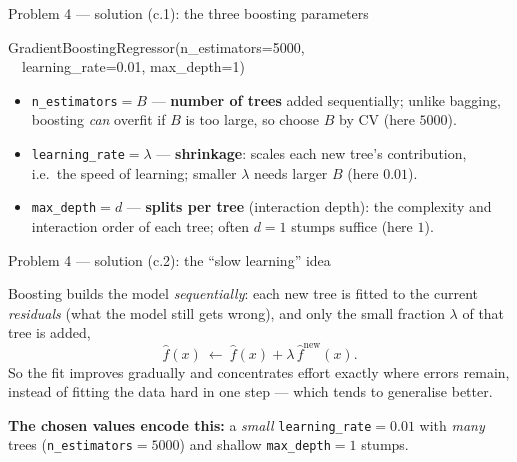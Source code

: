 \documentclass[aspectratio=169,11pt]{beamer}
\begin{document}
\begin{frame}{Problem 4 --- solution (c.1): the three boosting parameters}
  \begin{solutionbox}
    \begin{center}\ttfamily\scriptsize
    GradientBoostingRegressor(n\_estimators=5000,\\
    \ \ learning\_rate=0.01, max\_depth=1)
    \end{center}
    \begin{itemize}
      \item \texttt{n\_estimators}$=B$ --- \textbf{number of trees} added sequentially; unlike
        bagging, boosting \emph{can} overfit if $B$ is too large, so choose $B$ by CV (here
        $5000$).
      \item \texttt{learning\_rate}$=\lambda$ --- \textbf{shrinkage}: scales each new tree's
        contribution, i.e.\ the speed of learning; smaller $\lambda$ needs larger $B$ (here
        $0.01$).
      \item \texttt{max\_depth}$=d$ --- \textbf{splits per tree} (interaction depth): the
        complexity and interaction order of each tree; often $d=1$ stumps suffice (here $1$).
    \end{itemize}
  \end{solutionbox}
\end{frame}

\begin{frame}{Problem 4 --- solution (c.2): the ``slow learning'' idea}
  \begin{solutionbox}
    Boosting builds the model \emph{sequentially}: each new tree is fitted to the current
    \emph{residuals} (what the model still gets wrong), and only the small fraction $\lambda$ of
    that tree is added,
    \[
      \hat f(x)\ \leftarrow\ \hat f(x)+\lambda\,\hat f^{\text{new}}(x).
    \]
    So the fit improves gradually and concentrates effort exactly where errors remain, instead of
    fitting the data hard in one step --- which tends to generalise better.
    \medskip

    \textbf{The chosen values encode this:} a \emph{small} \texttt{learning\_rate}$=0.01$ with
    \emph{many} trees (\texttt{n\_estimators}$=5000$) and shallow \texttt{max\_depth}$=1$ stumps.
  \end{solutionbox}
\end{frame}
\end{document}
